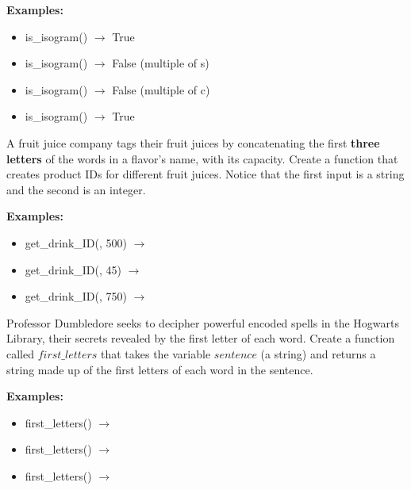 	\textbf{Examples:}
		\begin{itemize}
			\item is\_isogram() $\rightarrow$ True
			\item is\_isogram() $\rightarrow$ False (multiple of s)
			\item is\_isogram() $\rightarrow$ False (multiple of c)
			\item is\_isogram() $\rightarrow$ True
		\end{itemize}

	\item 
		A fruit juice company tags their fruit juices by concatenating the first 
		\textbf{three letters} of the words in a flavor's name, with its capacity. 
		Create a function that creates product IDs for different fruit juices.
		Notice that the first input is a string and the second is an integer.
		
	\textbf{Examples:}
		\begin{itemize}
			\item get\_drink\_ID(, 500) $\rightarrow$ 
			\item get\_drink\_ID(, 45) $\rightarrow$ 
			\item get\_drink\_ID(, 750) $\rightarrow$ 
		\end{itemize}





	\item 
		Professor Dumbledore seeks to decipher powerful encoded spells in the Hogwarts Library, 
		their secrets revealed by the first letter of each word. Create a function called 
		$first\_letters$ that takes the variable $sentence$ (a string) and returns
		a string made up of the first letters of each word in the sentence. 

		\textbf{Examples:}
		\begin{itemize}
			\item first\_letters() 
				$\rightarrow$ 
			\item first\_letters() $\rightarrow$ 
			\item first\_letters() $\rightarrow$ 
		\end{itemize}

